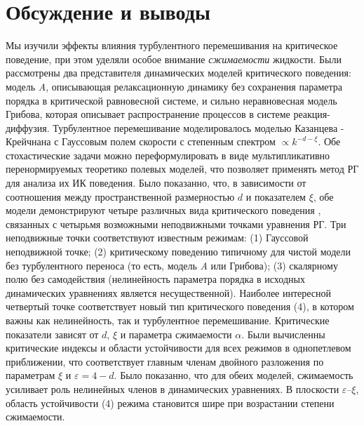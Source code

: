 \documentclass[a4paper,10pt]{article}
\begin{document}
\section{Обсуждение и выводы} \label{sec:Conc}
Мы изучили эффекты влияния турбулентного перемешивания на критическое поведение, при этом уделяли особое внимание {\it сжимаемости} жидкости.
Были рассмотрены два представителя динамических моделей критического поведения: модель {\it A}, описывающая релаксационную динамику без
сохранения параметра порядка в критической равновесной системе, и сильно неравновесная модель Грибова, которая описывает распространение процессов в системе реакция-диффузия.
Турбулентное перемешивание моделировалось моделью Казанцева - Крейчнана с Гауссовым полем скорости с степенным спектром $\propto k^{-d-\xi}$.
Обе стохастические задачи можно переформулировать в виде мультипликативно перенормируемых  теоретико полевых моделей, что позволяет применять метод РГ для анализа их ИК поведения.
Было показанно, что, в зависимости от соотношения между пространственной размерностью  $d$ и показателем  $\xi$, обе модели демонстрируют четыре различных вида критического поведения
, связанных с четырьмя возможными неподвижными точками уравнения РГ.
Три неподвижные точки соответствуют известным режимам: (1) Гауссовой неподвижной точке; (2) критическому поведению типичному для чистой модели без турбулентного переноса
(то есть, модель {\it A} или Грибова); (3) скалярному полю без самодействия (нелинейность параметра порядка в исходных динамических
уравнениях является несущественной).
Наиболее интересной четвертый точке соответствует новый тип критического поведения (4), в котором важны как нелинейность, так и
турбулентное перемешивание. Критические показатели зависят от $d$, $\xi$ и параметра сжимаемости $\alpha$.
Были вычисленны критические индексы и области устойчивости для всех режимов в однопетлевом приближении,
что соответствует главным членам двойного разложения по параметрам $\xi$ и $\varepsilon=4-d$.
Было показанно, что для обеих моделей, сжимаемость усиливает роль нелинейных членов в динамических уравнениях.
В плоскости $\varepsilon$--$\xi$, область устойчивости (4) режима становится шире при возрастании степени сжимаемости.
\end{document}
